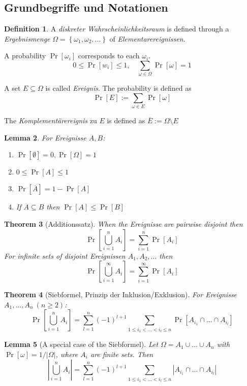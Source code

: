 \documentclass[12pt]{extarticle}
\theoremstyle{definition}
\newtheorem{definition}{Definition}[section]
\theoremstyle{remark}
\theoremstyle{plain}
\newtheorem{theorem}[definition]{Theorem}
\theoremstyle{plain}
\newtheorem{lemma}[definition]{Lemma}
\theoremstyle{plain}
\begin{document}
\subsection{Grundbegriffe und Notationen}

\begin{definition}
    A \textit{diskreter Wahrscheinlichkeitsraum} is defined through a \textit{Ergebnismenge}
    $\Omega = \left\{ \omega_1, \omega_2, ... \right\}$ of \textit{Elementarereignissen}.

    A probability $\Pr[\omega_i]$ corresponds to each $\omega_i$.
    \[0 \le \Pr[w_i] \le 1,\quad \sum_{\omega \in \Omega} \Pr[\omega] = 1\]

    A set $E \subseteq \Omega$ is called \textit{Ereignis}. The probability is defined as
    \[ \Pr[E] := \sum_{\omega \in E} \Pr[\omega] \]

    The \textit{Komplementärereignis} zu $E$ is defined as $\overline{E} := \Omega \setminus E$
\end{definition}

\begin{lemma}
    For \textit{Ereignisse} $A,B$:
    \begin{enumerate}
        \item $\Pr[\emptyset] = 0, \Pr[\Omega] = 1$
        \item $0 \le \Pr[A] \le 1$
        \item $\Pr[\overline{A}] = 1 - \Pr[A]$
        \item If $A \subseteq B$ then $\Pr[A] \le \Pr[B]$
    \end{enumerate}
\end{lemma}

\begin{theorem}[Additionssatz]
    When the \textit{Ereignisse} are pairwise disjoint then
    \[ \Pr \left[ \bigcup_{i=1}^n A_i \right] = \sum_{i=1}^n \Pr[A_i] \]
    For infinite sets of disjoint Ereignissen $A_1, A_2, ...$ then
    \[ \Pr \left[ \bigcup_{i=1}^\infty A_i \right] = \sum_{i=1}^\infty \Pr[A_i] \]
\end{theorem}

\begin{theorem}[Siebformel, Prinzip der Inklusion/Exklusion]
    For Ereignisse $A_1, ..., A_n \ (n \ge 2)$:
    \[ \Pr \left[ \bigcup_{i=1}^n A_i \right] = \sum_{l=1}^n (-1)^{l+1} \sum_{1 \le i_1 < ... < i_l \le n} \Pr[A_{i_1} \cap ... \cap A_{i_l}] \]
\end{theorem}

\begin{lemma}[A special case of the Siebformel]
    Let $\Omega = A_1 \cup ... \cup A_n$ with $\Pr[\omega] = 1/|\Omega|$,
    where $A_i$ are finite sets.
    Then
    \[ | \bigcup_{i=1}^n A_i | = \sum_{l=1}^n (-1)^{l+1} \sum_{1 \le i_1 < ... < i_l \le n} |A_{i_1} \cap ... \cap A_{i_l}| \]
\end{lemma}
\end{document}

